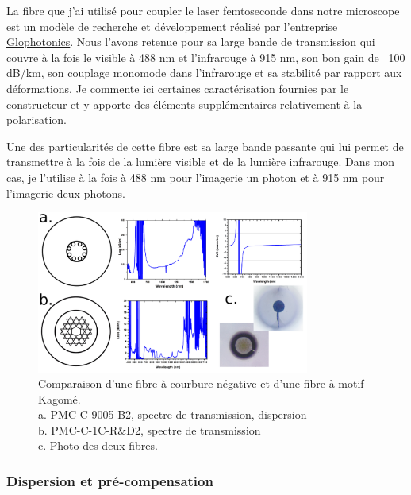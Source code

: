 La fibre que j'ai utilisé pour coupler le laser femtoseconde dans notre microscope est un modèle de recherche et développement réalisé par l'entreprise \href{http://www.glophotonics.fr/}{Glophotonics}. Nous l'avons retenue pour sa large bande de transmission qui couvre à la fois le visible à 488 nm et l'infrarouge à 915 nm, son bon gain de ~100 dB/km, son couplage monomode dans l'infrarouge et sa stabilité par rapport aux déformations. Je commente ici certaines caractérisation fournies par le constructeur et y apporte des éléments supplémentaires relativement à la polarisation.

Une des particularités de cette fibre est sa large bande passante qui lui permet de transmettre à la fois de la lumière visible et de la lumière infrarouge. Dans mon cas, je l'utilise à la fois à 488 nm pour l'imagerie un photon et à 915 nm pour l'imagerie deux photons.

\begin{figure}
\centering
\includegraphics[width=0.8\textwidth]{./files/glofibers.svg.png}
\caption{Comparaison d'une fibre à courbure négative et d'une fibre à motif Kagomé.\\
a. PMC-C-9005 B2, spectre de transmission, dispersion\\
b. PMC-C-1C-R\&D2, spectre de transmission\\
c. Photo des deux fibres.}
\end{figure}

\subsubsection{Dispersion et pré-compensation}

